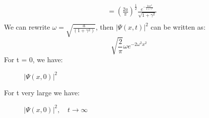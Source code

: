\documentclass{article}
\begin{document}
\begin{enumerate}[label=(\alph*)]
\begin{align*}
		                    & = \left(\frac{2a}{\pi}\right)^\frac{1}{2} \frac{e^{-\frac{2ax^2}{1 + \gamma^2}}}{\sqrt{1 + \gamma^2}}                                                                                                               \\
	      \end{align*}
	      We can rewrite \(\omega = \sqrt{\frac{a}{\left(1+\gamma^2\right)}}\), then \(|\Psi(x,t)|^2\) can be written as:
	      \[\sqrt{\frac{2}{\pi}} \omega e^{-2 \omega^2 x^2}\]
	      For t = 0, we have:
	      \begin{figure}[H]
		      \centering
		      \caption{\(|\Psi(x,0)|^2\)}

	      \end{figure}
	      For t very large we have:
	      \begin{figure}[H]
		      \centering
		      \caption{\(|\Psi(x,0)|^2, \quad t \rightarrow \infty\)}


\end{figure}
\end{enumerate}
\end{document}
